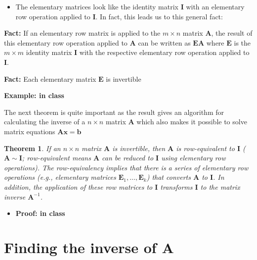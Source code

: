 \documentclass[
]{book}
\providecommand{\tightlist}{%
  \setlength{\itemsep}{0pt}\setlength{\parskip}{0pt}}
\newtheorem{theorem}{Theorem}[chapter]
\theoremstyle{definition}
\theoremstyle{definition}
\theoremstyle{definition}
\theoremstyle{definition}
\theoremstyle{remark}
\begin{document}
\begin{itemize}
\tightlist
\item
  The elementary matrices look like the identity matrix \(\mathbf{I}\) with an elementary row operation applied to \(\mathbf{I}\). In fact, this leads us to this general fact:
\end{itemize}

\textbf{Fact:} If an elementary row matrix is applied to the \(m \times n\) matrix \(\mathbf{A}\), the result of this elementary row operation applied to \(\mathbf{A}\) can be written as \(\mathbf{E} \mathbf{A}\) where \(\mathbf{E}\) is the \(m \times m\) identity matrix \(\mathbf{I}\) with the respective elementary row operation applied to \(\mathbf{I}\).

\textbf{Fact:} Each elementary matrix \(\mathbf{E}\) is invertible

\textbf{Example: in class}

The next theorem is quite important as the result gives an algorithm for calculating the inverse of a \(n \times n\) matrix \(\mathbf{A}\) which also makes it possible to solve matrix equations \(\mathbf{A}\mathbf{x} = \mathbf{b}\)

\begin{theorem}
If an \(n \times n\) matrix \(\mathbf{A}\) is invertible, then \(\mathbf{A}\) is row-equivalent to \(\mathbf{I}\) (\(\mathbf{A} \sim \mathbf{I}\); row-equivalent means \(\mathbf{A}\) can be reduced to \(\mathbf{I}\) using elementary row operations). The row-equivalency implies that there is a series of elementary row operations (e.g., elementary matrices \(\mathbf{E}_1, \ldots, \mathbf{E}_k\)) that converts \(\mathbf{A}\) to \(\mathbf{I}\). In addition, the application of these row matrices to \(\mathbf{I}\) transforms \(\mathbf{I}\) to the matrix inverse \(\mathbf{A}^{-1}\).
\end{theorem}

\begin{itemize}
\tightlist
\item
  \textbf{Proof: in class}
\end{itemize}

\hypertarget{finding-the-inverse-of-mathbfa}{%
\section{\texorpdfstring{Finding the inverse of \(\mathbf{A}\)}{Finding the inverse of \textbackslash mathbf\{A\}}}\label{finding-the-inverse-of-mathbfa}}
\end{document}
